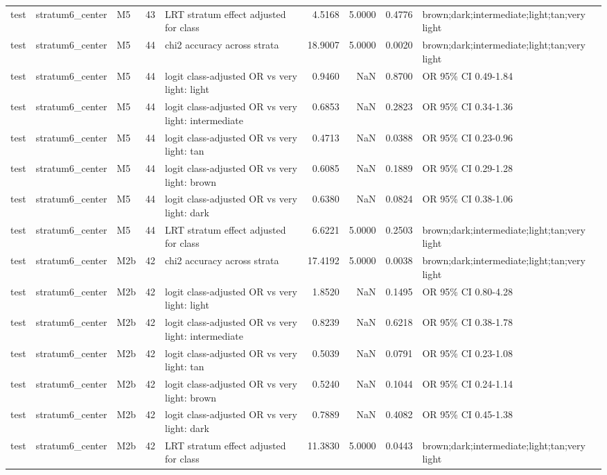 \begin{tabular}{lllrlrrrl}
test & stratum6\_center & M5 & 43 & LRT stratum effect adjusted for class & 4.5168 & 5.0000 & 0.4776 & brown;dark;intermediate;light;tan;very light \\
test & stratum6\_center & M5 & 44 & chi2 accuracy across strata & 18.9007 & 5.0000 & 0.0020 & brown;dark;intermediate;light;tan;very light \\
test & stratum6\_center & M5 & 44 & logit class-adjusted OR vs very light: light & 0.9460 & NaN & 0.8700 & OR 95\% CI 0.49-1.84 \\
test & stratum6\_center & M5 & 44 & logit class-adjusted OR vs very light: intermediate & 0.6853 & NaN & 0.2823 & OR 95\% CI 0.34-1.36 \\
test & stratum6\_center & M5 & 44 & logit class-adjusted OR vs very light: tan & 0.4713 & NaN & 0.0388 & OR 95\% CI 0.23-0.96 \\
test & stratum6\_center & M5 & 44 & logit class-adjusted OR vs very light: brown & 0.6085 & NaN & 0.1889 & OR 95\% CI 0.29-1.28 \\
test & stratum6\_center & M5 & 44 & logit class-adjusted OR vs very light: dark & 0.6380 & NaN & 0.0824 & OR 95\% CI 0.38-1.06 \\
test & stratum6\_center & M5 & 44 & LRT stratum effect adjusted for class & 6.6221 & 5.0000 & 0.2503 & brown;dark;intermediate;light;tan;very light \\
test & stratum6\_center & M2b & 42 & chi2 accuracy across strata & 17.4192 & 5.0000 & 0.0038 & brown;dark;intermediate;light;tan;very light \\
test & stratum6\_center & M2b & 42 & logit class-adjusted OR vs very light: light & 1.8520 & NaN & 0.1495 & OR 95\% CI 0.80-4.28 \\
test & stratum6\_center & M2b & 42 & logit class-adjusted OR vs very light: intermediate & 0.8239 & NaN & 0.6218 & OR 95\% CI 0.38-1.78 \\
test & stratum6\_center & M2b & 42 & logit class-adjusted OR vs very light: tan & 0.5039 & NaN & 0.0791 & OR 95\% CI 0.23-1.08 \\
test & stratum6\_center & M2b & 42 & logit class-adjusted OR vs very light: brown & 0.5240 & NaN & 0.1044 & OR 95\% CI 0.24-1.14 \\
test & stratum6\_center & M2b & 42 & logit class-adjusted OR vs very light: dark & 0.7889 & NaN & 0.4082 & OR 95\% CI 0.45-1.38 \\
test & stratum6\_center & M2b & 42 & LRT stratum effect adjusted for class & 11.3830 & 5.0000 & 0.0443 & brown;dark;intermediate;light;tan;very light \\

\end{tabular}
